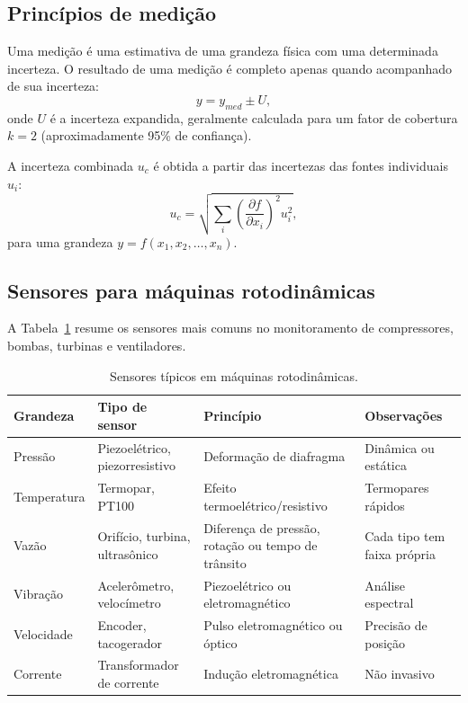 \documentclass[12pt,a4paper]{article}
\numberwithin{equation}{section}
\numberwithin{table}{section}
\numberwithin{figure}{section}
\begin{document}
\subsection{Princípios de medição}

Uma medição é uma estimativa de uma grandeza física com uma determinada
incerteza. O resultado de uma medição é completo apenas quando acompanhado de
sua incerteza:
\begin{equation}\label{eq:v1-c9-1}
y = y_{med} \pm U,
\end{equation}
onde $U$ é a incerteza expandida, geralmente calculada para um fator de
cobertura $k=2$ (aproximadamente 95\% de confiança).

A incerteza combinada $u_c$ é obtida a partir das incertezas das fontes
individuais $u_i$:
\begin{equation}\label{eq:v1-c9-2}
u_c = \sqrt{\sum_i \left(\frac{\partial f}{\partial x_i}\right)^2 u_i^2},
\end{equation}
para uma grandeza $y = f(x_1, x_2, \ldots, x_n)$.

\subsection{Sensores para máquinas rotodinâmicas}

A Tabela~\ref{tab:v1-c9-1} resume os sensores mais comuns no monitoramento de
compressores, bombas, turbinas e ventiladores.

\begin{table}[H]
\centering
\caption{Sensores típicos em máquinas rotodinâmicas.}
\label{tab:v1-c9-1}
\small
\begin{tabular}{@{}p{2.0cm}p{3.0cm}p{4.0cm}p{4.2cm}@{}}
\toprule
\textbf{Grandeza} & \textbf{Tipo de sensor} & \textbf{Princípio} & \textbf{Observações} \\
\midrule
Pressão & Piezoelétrico, piezorresistivo & Deformação de diafragma & Dinâmica ou estática \\
Temperatura & Termopar, PT100 & Efeito termoelétrico/resistivo & Termopares rápidos \\
Vazão & Orifício, turbina, ultrasônico & Diferença de pressão, rotação ou tempo de trânsito & Cada tipo tem faixa própria \\
Vibração & Acelerômetro, velocímetro & Piezoelétrico ou eletromagnético & Análise espectral \\
Velocidade & Encoder, tacogerador & Pulso eletromagnético ou óptico & Precisão de posição \\
Corrente & Transformador de corrente & Indução eletromagnética & Não invasivo \\
\bottomrule
\end{tabular}
\end{table}
\end{document}
